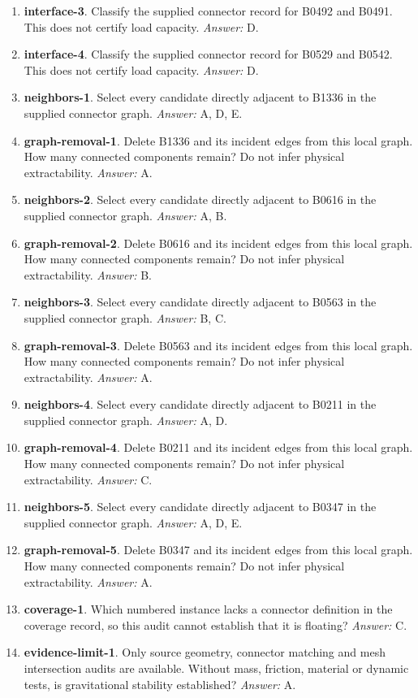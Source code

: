 \begin{enumerate}
\item \textbf{interface-3}. Classify the supplied connector record for B0492 and B0491. This does not certify load capacity. \textit{Answer:} D.
\item \textbf{interface-4}. Classify the supplied connector record for B0529 and B0542. This does not certify load capacity. \textit{Answer:} D.
\item \textbf{neighbors-1}. Select every candidate directly adjacent to B1336 in the supplied connector graph. \textit{Answer:} A, D, E.
\item \textbf{graph-removal-1}. Delete B1336 and its incident edges from this local graph. How many connected components remain? Do not infer physical extractability. \textit{Answer:} A.
\item \textbf{neighbors-2}. Select every candidate directly adjacent to B0616 in the supplied connector graph. \textit{Answer:} A, B.
\item \textbf{graph-removal-2}. Delete B0616 and its incident edges from this local graph. How many connected components remain? Do not infer physical extractability. \textit{Answer:} B.
\item \textbf{neighbors-3}. Select every candidate directly adjacent to B0563 in the supplied connector graph. \textit{Answer:} B, C.
\item \textbf{graph-removal-3}. Delete B0563 and its incident edges from this local graph. How many connected components remain? Do not infer physical extractability. \textit{Answer:} A.
\item \textbf{neighbors-4}. Select every candidate directly adjacent to B0211 in the supplied connector graph. \textit{Answer:} A, D.
\item \textbf{graph-removal-4}. Delete B0211 and its incident edges from this local graph. How many connected components remain? Do not infer physical extractability. \textit{Answer:} C.
\item \textbf{neighbors-5}. Select every candidate directly adjacent to B0347 in the supplied connector graph. \textit{Answer:} A, D, E.
\item \textbf{graph-removal-5}. Delete B0347 and its incident edges from this local graph. How many connected components remain? Do not infer physical extractability. \textit{Answer:} A.
\item \textbf{coverage-1}. Which numbered instance lacks a connector definition in the coverage record, so this audit cannot establish that it is floating? \textit{Answer:} C.
\item \textbf{evidence-limit-1}. Only source geometry, connector matching and mesh intersection audits are available. Without mass, friction, material or dynamic tests, is gravitational stability established? \textit{Answer:} A.

\end{enumerate}
